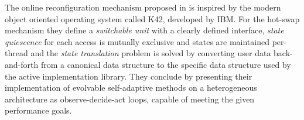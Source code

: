 The online reconfiguration mechanism proposed in \cite{evolvable} is inspired by the modern object oriented operating system called K42, developed by IBM. For the hot-swap mechanism they define a \emph{switchable unit} with a clearly defined interface, \emph{state quiescence} for each access is mutually exclusive and states are maintained per-thread and the \emph{state translation} problem is solved by converting user data back-and-forth from a canonical data structure to the specific data structure used by the active implementation library. They conclude by presenting their implementation of evolvable self-adaptive methods on a heterogeneous architecture as observe-decide-act loops, capable of meeting the given performance goals. 

